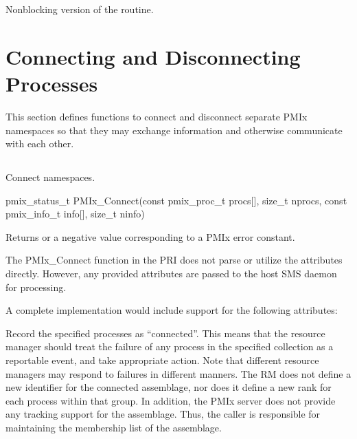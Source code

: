 Nonblocking version of the  routine.


\section{Connecting and Disconnecting Processes}
\label{chap:api_proc_mgmt:connect}

This section defines functions to connect and disconnect separate \ac{PMIx} namespaces so that they may exchange information and otherwise communicate with each other.

\subsection{}

\summary

Connect namespaces.

\format

\cspecificstart
\begin{codepar}
pmix_status_t
PMIx_Connect(const pmix_proc_t procs[], size_t nprocs,
             const pmix_info_t info[], size_t ninfo)
\end{codepar}
\cspecificend

\begin{arglist}
\end{arglist}

Returns  or a negative value corresponding to a PMIx error constant.

\priattr
The PMIx_Connect function in the \ac{PRI} does not parse or utilize the attributes directly. However, any provided attributes are passed to the host \ac{SMS} daemon for processing.

\optattr
A complete implementation would include support for the following attributes:


\descr

Record the specified processes as ``connected''.
This means that the resource manager should treat the failure of any process in the specified collection as a reportable event, and take appropriate action.
Note that different resource managers may respond to failures in different manners. The RM does not define a new identifier for the connected assemblage, nor does it define a new rank for each process within that group. In addition, the \ac{PMIx} server does not provide any tracking support for the assemblage. Thus, the caller is responsible for maintaining the membership list of the assemblage.


